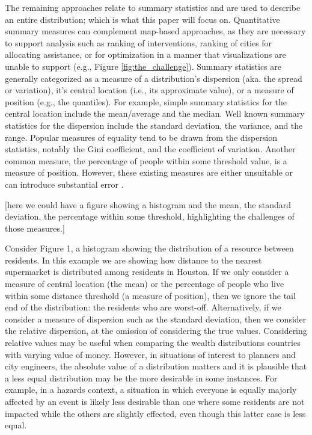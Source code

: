 \documentclass[final,3p,times,onecolumn,sort&compress]{elsarticle}
\begin{document}
The remaining approaches relate to summary statistics and are used to describe an entire distribution; which is what this paper will focus on.
Quantitative summary measures can complement map-based approaches, as they are necessary to support analysis such as ranking of interventions, ranking of cities for allocating assistance, or for optimization in a manner that visualizations are unable to support (e.g., Figure \ref{fig:the_challenge}).
Summary statistics are generally categorized as a measure of a distribution's dispersion (aka. the spread or variation), it's central location (i.e., its approximate value), or a measure of position (e.g., the quantiles).
For example, simple summary statistics for the central location include the mean/average and the median.
Well known summary statistics for the dispersion include the standard deviation, the variance, and the range.
Popular measures of equality tend to be drawn from the dispersion statistics, notably the Gini coefficient, and the coefficient of variation.
Another common measure, the percentage of people within some threshold value, is a measure of position.
However, these existing measures are either unsuitable or can introduce substantial error \citep{Kolak2018-az,Logan2019-fr}.
\newline

\begin{center}
[here we could have a figure showing a histogram and the mean, the standard deviation, the percentage within some threshold, highlighting the challenges of those measures.]
\newline
\end{center}

Consider Figure 1, a histogram showing the distribution of a resource between residents.
In this example we are showing how distance to the nearest supermarket is distributed among residents in Houston. 
If we only consider a measure of central location (the mean) or the percentage of people who live within some distance threshold (a measure of position), then we ignore the tail end of the distribution: the residents who are worst-off.
Alternatively, if we consider a measure of dispersion such as the standard deviation, then we consider the relative dispersion, at the omission of considering the true values. 
Considering relative values may be useful when comparing the wealth distributions countries with varying value of money.
However, in situations of interest to planners and city engineers, the absolute value of a distribution matters and it is plausible that a less equal distribution may be the more desirable in some instances.
For example, in a hazards context, a situation in which everyone is equally majorly affected by an event is likely less desirable than one where some residents are not impacted while the others are slightly effected, even though this latter case is less equal.
\end{document}
